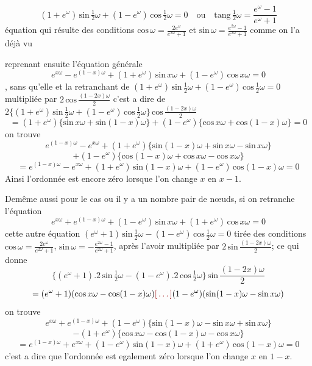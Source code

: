 \documentclass[11pt,a4paper]{article}
\begin{document}

\[ (1+e^{\omega})\,\text{sin}\,\tfrac{1}{2}\omega + (1-e^{\omega})\,\text{cos}\,\tfrac{1}{2}\omega = 0 \quad\text{ou}\quad \text{tang}\,\tfrac{1}{2}\omega = \frac{e^{\omega}-1}{e^{\omega}+1} \]
équation qui résulte des conditions $\text{cos}\,\omega = \frac{2e^{\omega}}{e^{2\omega}+1}$ et $\text{sin}\,\omega = \frac{e^{2\omega}-1}{e^{2\omega}+1}$
comme on l'a déjà vu

reprenant ensuite l'équation générale
\[ e^{x\omega} - e^{(1-x)\omega} + (1+e^{\omega})\,\text{sin}\,x\omega + (1-e^{\omega})\,\text{cos}\,x\omega = 0 \]
, sans qu'elle 
et la retranchant de $(1+e^{\omega})\,\text{sin}\,\frac{1}{2}\omega + (1-e^{\omega})\,\text{cos}\,\frac{1}{2}\omega = 0$ multipliée par $2\,\text{cos}\,\frac{(1-2x)\omega}{2}$
c'est a dire de $2\{(1+e^{\omega})\,\text{sin}\,\frac{1}{2}\omega + (1-e^{\omega})\,\text{cos}\,\frac{1}{2}\omega\}\,\text{cos}\,\frac{(1-2x)\omega}{2}$
\[ = (1+e^{\omega})\{\text{sin}\,x\omega + \text{sin}(1-x)\omega\} + (1-e^{\omega})\{\text{cos}\,x\omega + \text{cos}(1-x)\omega\} = 0 \]
on trouve
\[ e^{(1-x)\omega} - e^{x\omega} + (1+e^{\omega})\{\text{sin}(1-x)\omega + \text{sin}\,x\omega - \text{sin}\,x\omega\} \]
\[ + (1-e^{\omega})\{\text{cos}(1-x)\omega + \text{cos}\,x\omega - \text{cos}\,x\omega\} \]
\[ = e^{(1-x)\omega} - e^{x\omega} + (1+e^{\omega})\,\text{sin}(1-x)\omega + (1-e^{\omega})\,\text{cos}(1-x)\omega = 0 \]
Ainsi l'ordonnée est encore zéro lorsque l'on change $x$ en
$x-1$.

Demême aussi pour le cas ou il y a un nombre pair
de nœuds, si on  retranche  l'équation
\[ e^{x\omega} + e^{(1-x)\omega} + (1-e^{\omega})\,\text{sin}\,x\omega + (1+e^{\omega})\,\text{cos}\,x\omega = 0 \]
cette autre équation $(e^{\omega}+1)\,\text{sin}\,\frac{1}{2}\omega - (1-e^{\omega})\,\text{cos}\,\frac{1}{2}\omega = 0$ tirée des
conditions $\text{cos}\,\omega = \frac{2e^{\omega}}{e^{2\omega}+1}$, $\text{sin}\,\omega = -\frac{e^{2\omega}-1}{e^{2\omega}+1}$, après l'avoir multipliée
par $2\,\text{sin}\,\frac{(1-2x)\omega}{2}$; ce qui donne
\[ \{(e^{\omega}+1).2\,\text{sin}\,\tfrac{1}{2}\omega - (1-e^{\omega}).2\,\text{cos}\,\tfrac{1}{2}\omega\}\,\text{sin}\,\frac{(1-2x)\omega}{2} \]
\[ = (e^{\omega}+1)(\text{cos}\,x\omega - \text{cos}(1-x)\omega) \ill{} (1-e^{\omega})(\text{sin}(1-x)\omega - \text{sin}\,x\omega) \]
on trouve
\[ e^{x\omega} + e^{(1-x)\omega} + (1-e^{\omega})\{\text{sin}(1-x)\omega - \text{sin}\,x\omega + \text{sin}\,x\omega\} \]
\[ - (1+e^{\omega})\{\text{cos}\,x\omega - \text{cos}(1-x)\omega - \text{cos}\,x\omega\} \]
\[ = e^{(1-x)\omega} + e^{x\omega} + (1-e^{\omega})\,\text{sin}(1-x)\omega + (1+e^{\omega})\,\text{cos}(1-x)\omega = 0 \]
c'est a dire que l'ordonnée est egalement zéro lorsque l'on change
$x$ en $1-x$.
\end{document}
